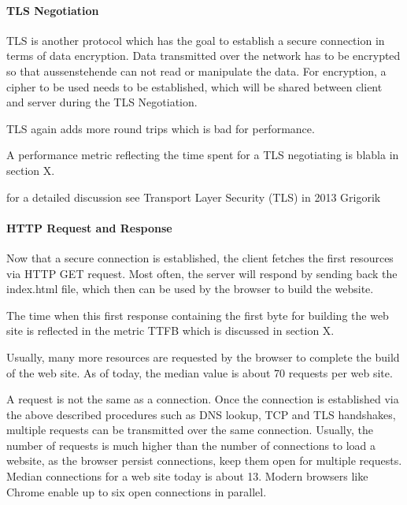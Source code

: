 

\paragraph{TLS Negotiation}

TLS is another protocol which has the goal to establish a secure connection in terms of data encryption.
Data transmitted over the network has to be encrypted so that aussenstehende can not read or manipulate the data.
For encryption,  a cipher to be used needs to be established, which will be shared between client and server during the TLS Negotiation. %

TLS again adds more round trips which is bad for performance.

A performance metric reflecting the time spent for a TLS negotiating is blabla in section X.

for a detailed discussion see Transport Layer Security (TLS) in 2013 Grigorik %




\paragraph{HTTP Request and Response}

Now that a secure connection is established, the client fetches the first resources via HTTP GET request.
Most often, the server will respond by sending back the index.html file, which then can be used by the browser to build the website. %

The time when this first response containing the first byte for building the web site is reflected in the metric TTFB which is discussed in section X.



Usually, many more resources are requested by the browser to complete the build of the web site.
As of today, the median value is about 70 requests per web site. %

A request is not the same as a connection.
Once the connection is established via the above described procedures such as DNS lookup, TCP and TLS handshakes, multiple requests can be transmitted over the same connection.
Usually, the number of requests is much higher than the number of connections to load a website, as the browser persist connections, keep them open for multiple requests.
Median connections for a web site today is about 13. %
Modern browsers like Chrome enable up to six open connections in parallel. %



